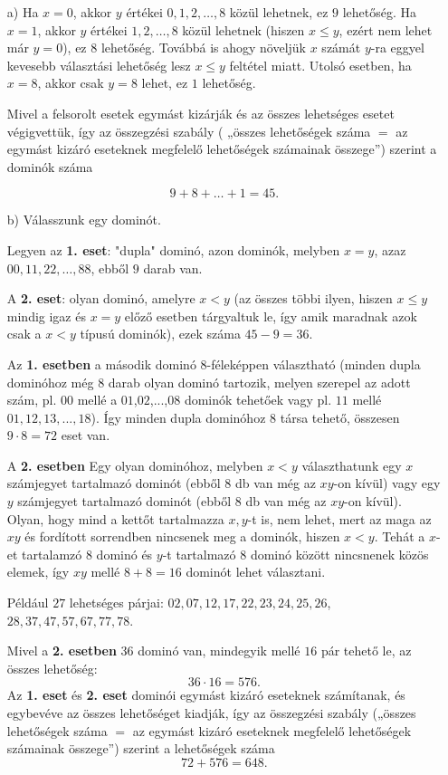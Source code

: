 \begin{solution}
\begin{enumerate}
\item[a)] Ha $x=0$, akkor $y$ értékei $0,1,2,\dots,8$ közül lehetnek, ez
$9$ lehetőség. Ha $x=1$, akkor $y$ értékei $1,2,\dots,8$ közül
lehetnek (hiszen $x\leq y$, ezért nem lehet már $y=0$), ez $8$
lehetőség. Továbbá is ahogy növeljük $x$ számát $y$-ra eggyel kevesebb
választási lehetőség lesz $x\leq y$ feltétel miatt. Utolsó esetben,
ha $x=8$, akkor csak $y=8$ lehet, ez $1$ lehetőség.

Mivel a felsorolt esetek egymást kizárják és az összes lehetséges
esetet végigvettük, így az összegzési szabály ( „összes lehetőségek
száma $=$ az egymást kizáró eseteknek megfelelő lehetőségek számainak
összege”) szerint a dominók száma

\[
9+8+\dots+1=45.
\]

\item[b)] Válasszunk egy dominót.

Legyen az \textbf{1. eset}: "dupla" dominó, azon dominók, melyben
$x=y$, azaz $00,11,22,\dots,88$, ebből $9$ darab van.

A \textbf{2. eset}: olyan dominó, amelyre $x<y$ (az összes többi
ilyen, hiszen $x\leq y$ mindig igaz és $x=y$ előző esetben tárgyaltuk
le, így amik maradnak azok csak a $x<y$ típusú dominók), ezek száma
$45-9=36$.

Az \textbf{1. esetben} a második dominó 8-féleképpen választható (minden
dupla dominóhoz még $8$ darab olyan dominó tartozik, melyen szerepel
az adott szám, pl. $00$ mellé a $01$,$02$,...,$08$ dominók tehetőek
vagy pl. $11$ mellé $01,12,13,...,18$). Így minden dupla dominóhoz
$8$ társa tehető, összesen $9\cdot8=72$ eset van.

A \textbf{2. esetben} Egy olyan dominóhoz, melyben $x<y$ választhatunk
egy $x$ számjegyet tartalmazó dominót (ebből $8$ db van még az $xy$-on
kívül) vagy egy $y$ számjegyet tartalmazó dominót (ebből $8$ db
van még az $xy$-on kívül). Olyan, hogy mind a kettőt tartalmazza
$x,y$-t is, nem lehet, mert az maga az $xy$ és fordított sorrendben
nincsenek meg a dominók, hiszen $x<y$. Tehát a $x$-et tartalamzó
$8$ dominó és $y$-t tartalmazó $8$ dominó között nincsnenek közös
elemek, így $xy$ mellé $8+8=16$ dominót lehet választani.

Például $27$ lehetséges párjai: $02,07,12,17,22,23,24,25,26$, $28,37,47,57,67,77,78$.

Mivel a \textbf{2. esetben} 36 dominó van, mindegyik mellé $16$ pár
tehető le, az összes lehetőség: 
\[
36\cdot16=576.
\]
Az \textbf{1. eset} és \textbf{2. eset} dominói egymást kizáró eseteknek
számítanak, és egybevéve az összes lehetőséget kiadják, így az összegzési
szabály („összes lehetőségek száma $=$ az egymást kizáró eseteknek
megfelelő lehetőségek számainak összege”) szerint a lehetőségek száma
\[
72+576=648.
\]


\end{enumerate}
\end{solution}
